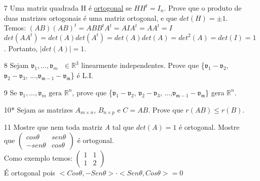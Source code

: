 \documentclass[a4paper]{article}
\begin{document}
\begin{itemize}
\item[7] Uma matriz quadrada H é \underline{ortogonal} se $HH^t=I_n$. Prove que o produto de duas matrizes ortogonais é uma matriz ortogonal, e que $det(H)=\pm 1$.
\\ \textcolor[rgb]{0,0,1}{
Temos: $(AB)(AB)^t=ABB^tA^t=AIA^t=AA^t=I$
\\$det(AA^t)=det(A)det(A^t)=det(A)det(A)=det^2(A)=det(I)=1$. Portanto, $|det(A)|=1$.
}

\item[8] Sejam $\mathfrak{v}_1,...,\mathfrak{v}_m\text{ }\in \mathbb{R}^3$ linearmente independentes. Prove que \{$\mathfrak{v_1-v_2}$,
$\mathfrak{v_2-v_3}$,
...,$\mathfrak{v_{m-1}-v_{m}}$\} é L.I.

\item[9] Se $\mathfrak{v}_1,...,\mathfrak{v}_m\text{ gera } \mathbb{R}^n$, prove que \{$\mathfrak{v_1-v_2}$,
$\mathfrak{v_2-v_3}$,
...,$\mathfrak{v_{m-1}-v_{m}}$\} gera $\mathbb{R}^n$.

\item[10*] Sejam as matrizes $A_{m\times n}$, $B_{n\times p}$ e $C=AB$. Prove que $r(AB)\leq r(B)$.

\item[11] Mostre que nem toda matriz \textit{A} tal que $det(A)=1$ é ortogonal. Mostre que $
\left(\begin{array}{rr}
cos\theta & sen\theta \\
-sen\theta & cos\theta
\end{array}\right)
$ é ortogonal.
\\ \textcolor[rgb]{0,0,1}{
Como exemplo temos:
$
\left(\begin{array}{rr}
1 & 1 \\
1 & 2
\end{array}\right)
$
\\É ortogonal pois $<Cos\theta,-Sen\theta>\cdot<Sen\theta,Cos\theta>=0$
}


\end{itemize}
\end{document}
